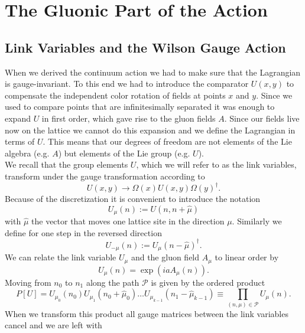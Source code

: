 \section{The Gluonic Part of the Action}

\subsection{Link Variables and the Wilson Gauge Action}
When we derived the continuum action we had to make sure that the Lagrangian is gauge-invariant. To this end we had to introduce the comparator $U(x,y)$ to compensate the independent color rotation of fields at  points $x$ and $y$. Since we used to compare points that are infinitesimally separated it was enough to expand $U$ in first order, which gave rise to the gluon fields $A$. Since our fields live now on the lattice we cannot do this expansion and we define the Lagrangian in terms of $U$. This means that our degrees of freedom are not elements of the Lie algebra (e.g. $A$) but elements of the Lie group (e.g. $U$). \\
We recall that the group elements $U$, which we will refer to as the link variables, transform under the gauge transformation according to
\begin{equation}
    U(x,y)\rightarrow\Omega(x)U(x,y)\Omega(y)^\dagger.
\end{equation}
Because of the discretization it is convenient to introduce the notation 
\begin{equation}
    U_\mu(n):= U(n,n+\hat\mu)
\end{equation}
with $\hat\mu$ the vector that moves one lattice site in the direction $\mu$. Similarly we define for one step in the reversed direction
\begin{equation}
    U_{-\mu}(n):=U_\mu(n-\hat\mu)^\dagger.
\end{equation}
We can relate the link variable $U_\mu$ and the gluon field $A_\mu$ to linear order by
\begin{equation}
    U_\mu(n)=\exp(iaA_\mu(n)).\label{eq:linkVarAndGluonField}
\end{equation}
Moving from $n_0$ to $n_1$ along the path $\mathcal P$ is given by the ordered product
\begin{equation}
    P[U]=U_{\mu_0}(n_0)U_{\mu_1}(n_0+\hat\mu_0)\dots U_{\mu_{k-1}}(n_1-\hat\mu_{k-1})\equiv\prod_{(n,\mu)\in\mathcal P}U_\mu(n). 
\end{equation}
When we transform this product all gauge matrices between the link variables cancel and we are left with
